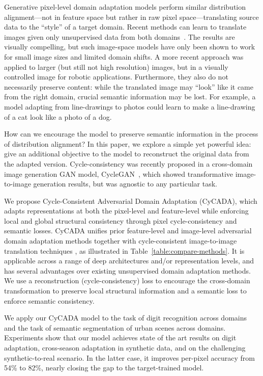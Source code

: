 Generative pixel-level domain adaptation models perform similar distribution alignment---not in feature space but rather in raw pixel space---translating source data to the ``style'' of a target domain. Recent methods can learn to translate images given only unsupervised data from both domains~\citep{bousmalis_cvpr17,liu_arxiv16,shrivastava_cvpr17}.
The results are visually compelling, but such image-space models have only been shown to work for small image sizes and limited domain shifts. A more recent approach \citep{bousmalis_arxiv17_robotic} was applied to larger (but still not high resolution) images, but in a visually controlled image for robotic applications. 
Furthermore, they also do not necessarily preserve content: while the translated image may ``look'' like it came from the right domain, crucial semantic information may be lost. For example, a model adapting from line-drawings to photos could learn to make a line-drawing of a cat look like a photo of a dog.

How can we encourage the model to preserve semantic information in the process of distribution alignment? In this paper, we explore a simple yet powerful idea: give an additional objective to the model to reconstruct the original data from the adapted version. Cycle-consistency was recently proposed in a cross-domain image generation GAN model, CycleGAN~\citep{zhu_arxiv17}, which showed transformative image-to-image generation results, but was agnostic to any particular task.


We propose Cycle-Consistent Adversarial Domain Adaptation (CyCADA), which adapts representations at both the pixel-level and feature-level while enforcing local and global structural consistency through pixel cycle-consistency and semantic losses.
CyCADA unifies prior feature-level \citep{ganin_icml15,tzeng_cvpr17} and image-level \citep{liu_arxiv16,bousmalis_cvpr17,shrivastava_cvpr17} adversarial domain adaptation methods together with cycle-consistent image-to-image translation techniques \citep{zhu_arxiv17}, as illustrated in Table~\ref{table:compare-methods}.
It is applicable across a range of deep architectures and/or representation levels, and 
has several advantages over existing unsupervised domain adaptation methods. We use a reconstruction (cycle-consistency) loss to encourage the cross-domain transformation to preserve local structural information and a semantic loss to enforce semantic consistency. 


We apply our CyCADA model to the task of digit recognition across domains and the task of semantic segmentation of urban scenes across domains. Experiments show that our model achieves state of the art results on digit adaptation, cross-season adaptation in synthetic data, and on the challenging synthetic-to-real scenario. In the latter case, it improves per-pixel accuracy from 54\% to 82\%, nearly closing the gap to the target-trained model.

